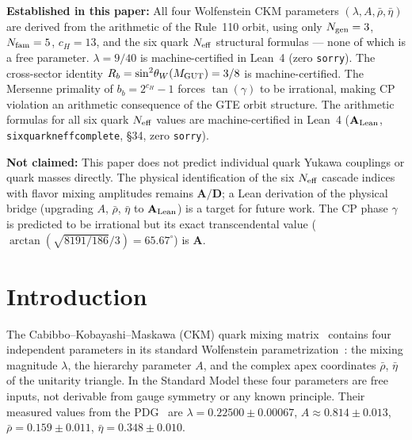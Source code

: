 \documentclass[11pt]{article}
\theoremstyle{remark}
\newcommand{\Ngen}{N_{\rm gen}}
\newcommand{\Nfam}{N_{\rm fam}}
\newcommand{\cH}{c_H}
\newcommand{\lean}[1]{%
  \penalty-100
  \begingroup\def\_{\textunderscore\allowbreak}\texttt{#1}\endgroup}
\newcommand{\lam}{\lambda}
\newcommand{\Rbar}{\bar{\rho}}
\newcommand{\Ebar}{\bar{\eta}}
\newcommand{\bb}{b_b}
\newcommand{\Rb}{R_b}
\newcommand{\sinwsq}{\sin^2\!\theta_W}
\newcommand{\CatA}{\textbf{A}}
\newcommand{\CatAL}{\ensuremath{\textbf{A}_{\rm Lean}}}
\newcommand{\CatAD}{\textbf{A/D}}
\begin{document}
\medskip

\begin{tcolorbox}[colback=orange!4,colframe=orange!55!black,
  title={\textbf{What this paper does and does not claim}},
  fonttitle=\bfseries,left=6pt,right=6pt,top=5pt,bottom=5pt]
\small
\textbf{Established in this paper:}
All four Wolfenstein CKM parameters $(\lam, A, \Rbar, \Ebar)$ are derived from the
arithmetic of the Rule~110 orbit, using only $\Ngen = 3$, $\Nfam = 5$, $\cH = 13$,
and the six quark $N_{\rm eff}$ structural formulas --- none of which is a free
parameter.
$\lam = 9/40$ is machine-certified in Lean~4 (zero \texttt{sorry}).
The cross-sector identity $\Rb = \sinwsq(M_{\rm GUT}) = 3/8$ is machine-certified.
The Mersenne primality of $\bb = 2^{\cH}-1$ forces $\tan(\gamma)$ to be irrational,
making CP violation an arithmetic consequence of the GTE orbit structure.
The arithmetic formulas for all six quark $N_{\rm eff}$ values are machine-certified
in Lean~4 ($\CatAL$, \lean{six\_quark\_neff\_complete}, \S34, zero \texttt{sorry}).

\textbf{Not claimed:}
This paper does not predict individual quark Yukawa couplings or quark masses directly.
The physical identification of the six $N_{\rm eff}$ cascade indices with flavor mixing
amplitudes remains $\CatAD$; a Lean derivation of the physical bridge (upgrading $A$,
$\Rbar$, $\Ebar$ to $\CatAL$) is a target for future work.
The CP phase $\gamma$ is predicted to be irrational but its exact transcendental value
($\arctan(\sqrt{8191/186}/3) = 65.67^\circ$) is $\CatA$.
\end{tcolorbox}

\medskip

\section{Introduction}
\label{sec:introduction}

The Cabibbo--Kobayashi--Maskawa (CKM) quark mixing matrix~\cite{Cabibbo1963,KobayashiMaskawa1973}
contains four independent parameters in its standard Wolfenstein
parametrization~\cite{Wolfenstein1983}: the mixing magnitude $\lam$, the
hierarchy parameter $A$, and the complex apex coordinates $\Rbar$, $\Ebar$
of the unitarity triangle.
In the Standard Model these four parameters are free inputs,
not derivable from gauge symmetry or any known principle.
Their measured values from the PDG~\cite{ParticleDataGroup2022} are
$\lam = 0.22500\pm 0.00067$, $A \approx 0.814\pm 0.013$,
$\Rbar = 0.159\pm 0.011$, $\Ebar = 0.348\pm 0.010$.
\end{document}
